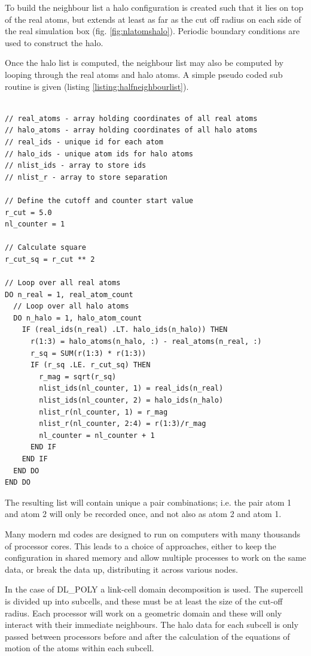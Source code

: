 To build the neighbour list a halo configuration is created such that it lies on top of the real atoms, but extends at least as far as the cut off radius on each side of the real simulation box (fig. \ref{fig:nlatomshalo}).  Periodic boundary conditions are used to construct the halo.

Once the halo list is computed, the neighbour list may also be computed by looping through the real atoms and halo atoms.  A simple pseudo coded sub routine is given (listing \ref{listing:halfneighbourlist}).

\FloatBarrier
\begin{lstlisting}[style=sPseudo,caption={Simple subroutine for generating a half size neighbour list},label={listing:halfneighbourlist}]

// real_atoms - array holding coordinates of all real atoms
// halo_atoms - array holding coordinates of all halo atoms
// real_ids - unique id for each atom
// halo_ids - unique atom ids for halo atoms
// nlist_ids - array to store ids
// nlist_r - array to store separation

// Define the cutoff and counter start value
r_cut = 5.0
nl_counter = 1

// Calculate square
r_cut_sq = r_cut ** 2

// Loop over all real atoms
DO n_real = 1, real_atom_count
  // Loop over all halo atoms
  DO n_halo = 1, halo_atom_count
    IF (real_ids(n_real) .LT. halo_ids(n_halo)) THEN
      r(1:3) = halo_atoms(n_halo, :) - real_atoms(n_real, :)
      r_sq = SUM(r(1:3) * r(1:3))
      IF (r_sq .LE. r_cut_sq) THEN          
        r_mag = sqrt(r_sq)          
        nlist_ids(nl_counter, 1) = real_ids(n_real)
        nlist_ids(nl_counter, 2) = halo_ids(n_halo)        
        nlist_r(nl_counter, 1) = r_mag
        nlist_r(nl_counter, 2:4) = r(1:3)/r_mag
        nl_counter = nl_counter + 1
      END IF
    END IF
  END DO
END DO 
\end{lstlisting}

The resulting list will contain unique a pair combinations; i.e. the pair atom 1 and atom 2 will only be recorded once, and not also as atom 2 and atom 1.

Many modern \acrshort{md} codes are designed to run on computers with many thousands of processor cores.  This leads to a choice of approaches, either to keep the configuration in shared memory and allow multiple processes to work on the same data, or break the data up, distributing it across various nodes.    

In the case of DL\_POLY a link-cell domain decomposition is used\cite{dlpolymanual}.  The supercell is divided up into subcells, and these must be at least the size of the cut-off radius.   Each processor will work on a geometric domain and these will only interact with their immediate neighbours.  The halo data for each subcell is only passed between processors before and after the calculation of the equations of motion of the atoms within each subcell.

